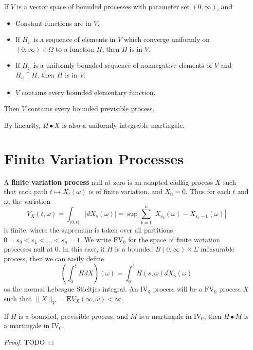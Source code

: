 \begin{lemma}
    If $V$ is a vector space of bounded processes with parameter set $(0,\infty)$, and
    \begin{itemize}
        \item Constant functions are in $V$.
        \item If $H_n$ is a sequence of elements in $V$ which converge uniformly on $(0,\infty) \times \Omega$ to a function $H$, then $H$ is in $V$.
        \item If $H_n$ is a uniformly bounded sequence of nonnegative elements of $V$ and $H_n \uparrow H$, then $H$ is in $V$.
        \item $V$ contains every bounded elementary function.
    \end{itemize}
    Then $V$ contains every bounded previsible process.
\end{lemma}

By linearity, $H \bullet X$ is also a uniformly integrable martingale.

\section{Finite Variation Processes}

A {\bf finite variation process} null at zero is an adapted c\'{a}dl\'{a}g process $X$ such that each path $t \mapsto X_t(\omega)$ is of finite variation, and $X_0 = 0$. Thus for each $t$ and $\omega$, the variation
%
\[ V_X(t,\omega) = \int_{(0,t]} |dX_s(\omega)| = \sup \sum_{k = 1}^n |X_{s_k}(\omega) - X_{s_k - 1}(\omega)| \]
%
is finite, where the supremum is taken over all partitions $0 = s_0 < s_1 < \dots < s_n = 1$. We write $\text{FV}_0$ for the space of finite variation processes null at $0$. In this case, if $H$ is a bounded $B(0,\infty) \times \Sigma$ measurable process, then we can easily define
%
\[ \left( \int_0^t H dX \right)(\omega) = \int_0^t H(s,\omega) dX_s(\omega) \]
%
as the normal Lebesgue Stieltjes integral. An $\text{IV}_0$ process will be a $\text{FV}_0$ process $X$ such that $\| X \|_V = \mathbf{E} V_X(\infty,\omega) < \infty$.

\begin{theorem}
    If $H$ is a bounded, previsible process, and $M$ is a martingale in $\text{IV}_0$, then $H \bullet M$ is a martingale in $\text{IV}_0$.
\end{theorem}
\begin{proof}
    TODO
\end{proof}

